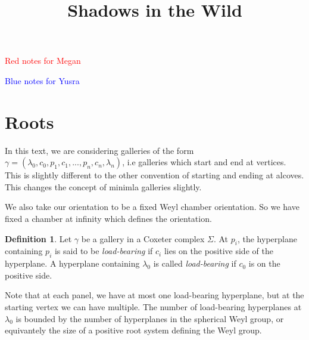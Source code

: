 \documentclass[11pt]{article}
\begin{document}
\newtheorem{theorem}{Theorem}
\theoremstyle{definition}
\newtheorem{definition}{Definition}
\newtheorem{proposition}{Proposition}
\newtheorem{example}{Example}
\newtheorem{lemma}{Lemma}
\newtheorem{corollary}{Corollary}
\newcommand{\uw}{\mathcal{U}(W,X)}
\newcommand{\W}{$(W,S)$}
\newcommand{\ix}{\textit}
\newcommand{\tr}{\textcolor{red}}
\newcommand{\sg}{$\Sigma$}


\title{Shadows in the Wild}
\maketitle
\tableofcontents 



\textcolor{red}{Red notes for Megan}

\textcolor{blue}{Blue notes for Yusra}

\section{Roots}

In this text, we are considering galleries of the form $\gamma=(\lambda_0,c_0,p_1,c_1,...,p_n,c_n,\lambda_n)$, i.e galleries which start and end at vertices. This is slightly different to the other convention of starting and ending at alcoves. This changes the concept of minimla galleries slightly. 

We also take our orientation to be a fixed Weyl chamber orientation. So we have fixed a chamber at infinity which defines the orientation.

\begin{definition}
    Let $\gamma$ be a gallery in a Coxeter complex $\Sigma$. At $p_i$, the hyperplane containing $p_i$ is said to be \ix{load-bearing} if $c_i$ lies on the positive side of the hyperplane. A hyperplane containing $\lambda_0$ is called \ix{load-bearing} if $c_0$ is on the positive side.
\end{definition}

Note that at each panel, we have at most one load-bearing hyperplane, but at the starting vertex we can have multiple. The number of load-bearing hyperplanes at $\lambda_0$ is bounded by the number of hyperplanes in the spherical Weyl group, or equivantely the size of a positive root system defining the Weyl group. 
\end{document}
